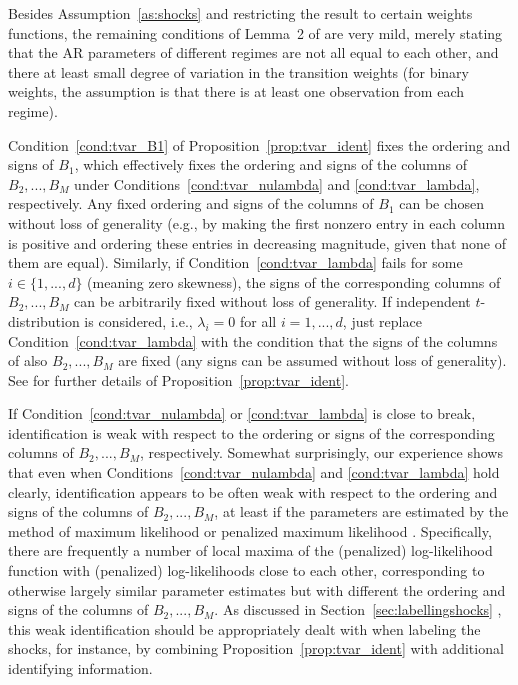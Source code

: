 \documentclass[nojss]{jss}
\begin{document}
Besides Assumption~\ref{as:shocks} and restricting the result to certain weights functions, the remaining conditions of Lemma~2 of \cite{Virolainen2:2024} are very mild, merely stating that the AR parameters of different regimes are not all equal to each other, and there at least small degree of variation in the transition weights (for binary weights, the assumption is that there is at least one observation from each regime).

Condition~\ref{cond:tvar_B1} of Proposition~\ref{prop:tvar_ident} fixes the ordering and signs of $B_1$, which effectively fixes the ordering and signs of the columns of $B_2,...,B_M$ under Conditions~\ref{cond:tvar_nulambda} and \ref{cond:tvar_lambda}, respectively. Any fixed ordering and signs of the columns of $B_1$ can be chosen without loss of generality (e.g., by making the first nonzero entry in each column is positive and ordering these entries in decreasing magnitude, given that none of them are equal). Similarly, if Condition~\ref{cond:tvar_lambda} fails for some $i\in\lbrace 1,...,d\rbrace$ (meaning zero skewness), the signs of the corresponding columns of $B_2,...,B_M$ can be arbitrarily fixed without loss of generality. If independent $t$-distribution is considered, i.e., $\lambda_i=0$ for all $i=1,...,d$, just replace Condition~\ref{cond:tvar_lambda} with the condition that the signs of the columns of also $B_2,...,B_M$ are fixed (any signs can be assumed without loss of generality). See \cite{Virolainen2:2024} for further details of Proposition~\ref{prop:tvar_ident}.

If Condition~\ref{cond:tvar_nulambda} or \ref{cond:tvar_lambda} is close to break, identification is weak with respect to the ordering or signs of the corresponding columns of $B_2,...,B_M$, respectively. Somewhat surprisingly, our experience shows that even when Conditions~\ref{cond:tvar_nulambda} and \ref{cond:tvar_lambda} hold clearly, identification appears to be often weak with respect to the ordering and signs of the columns of $B_2,...,B_M$, at least if the parameters are estimated by the method of maximum likelihood or penalized maximum likelihood \citep[which are the implemented methods in this package and those considered in][]{Virolainen2:2024}. Specifically, there are frequently a number of local maxima of the (penalized) log-likelihood function with (penalized) log-likelihoods close to each other, corresponding to otherwise largely similar parameter estimates but with different the ordering and signs of the columns of $B_2,...,B_M$. As discussed in Section~\ref{sec:labellingshocks} \citep[see also the related discussion in][]{Virolainen2:2024}, this weak identification should be appropriately dealt with when labeling the shocks, for instance, by combining Proposition~\ref{prop:tvar_ident} with additional identifying information.
\end{document}
